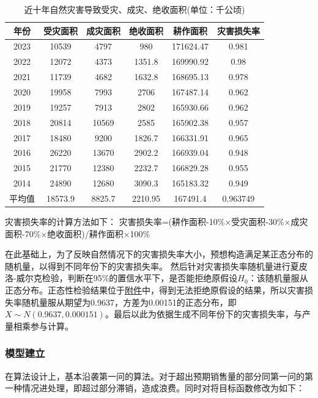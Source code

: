 \documentclass{cumcmthesis}
\begin{document}
\begin{table}[!htbp]
	\caption{近十年自然灾害导致受灾、成灾、绝收面积(单位：千公顷)}\label{tab004} \centering
	\begin{tabular}{|c|c|c|c|c|c|} 
		\hline
		年份   & 受灾面积    & 成灾面积   & 绝收面积    & 耕作面积      & 灾害损失率     \\ 
		\hline
		2023 & 10539   & 4797   & 980     & 171624.47 & 0.981     \\ 
		\hline
		2022 & 12072   & 4373   & 1351.8  & 169990.92 & 0.98      \\ 
		\hline
		2021 & 11739   & 4682   & 1632.8  & 168695.13 & 0.978     \\ 
		\hline
		2020 & 19958   & 7993   & 2706    & 167487.14 & 0.962     \\ 
		\hline
		2019 & 19257   & 7913   & 2802    & 165930.66 & 0.962     \\ 
		\hline
		2018 & 20814   & 10569  & 2585    & 165902.38 & 0.957     \\ 
		\hline
		2017 & 18480   & 9200   & 1826.7  & 166331.91 & 0.965     \\ 
		\hline
		2016 & 26220   & 13670  & 2902.2  & 166939.04 & 0.948     \\ 
		\hline
		2015 & 21770   & 12380  & 2232.7  & 166829.28 & 0.955     \\ 
		\hline
		2014 & 24890   & 12680  & 3090.3  & 165183.32 & 0.949     \\ 
		\hline
		平均值  & 18573.9 & 8825.7 & 2210.95 & 167491.4  & 0.963749  \\
		\hline
	\end{tabular}
\end{table}

灾害损失率的计算方法如下：
灾害损失率=(耕作面积-10\%$\times$受灾面积-30\%$\times$成灾面积-70\%$\times$绝收面积)/耕作面积$\times$100\%

在此基础上，为了反映自然情况下的灾害损失率大小，预想构造满足某正态分布的随机量，以得到不同年份下的灾害损失率。
然后针对灾害损失率随机量进行夏皮洛-威尔克检验，判断在95\%的置信水平下，是否能拒绝原假设$H_0$：该随机量服从正态分布。正态性检验结果位于\underline{附件}中，得到无法拒绝原假设的结果，所以灾害损失率随机量服从期望为0.9637，方差为0.00151的正态分布，即$X\sim N(0.9637,0.000151)$。最后以此为依据生成不同年份下的灾害损失率，与产量相乘参与计算。

\subsubsection{模型建立}
在算法设计上，基本沿袭第一问的算法。对于超出预期销售量的部分同第一问的第一种情况进处理，即超过部分滞销，造成浪费。同时对将目标函数修改为如下：
\end{document}
